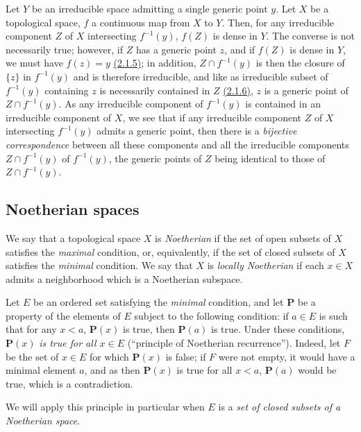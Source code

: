 \begin{env}[2.1.8]
\label{env-0.2.1.8}
Let $Y$ be an irreducible space admitting a single generic point $y$. Let $X$ be
a topological space, $f$ a continuous map from $X$ to $Y$. Then, for any
irreducible component $Z$ of $X$ intersecting $f^{-1}(y)$, $f(Z)$ is dense in
$Y$. The converse is not necessarily true; however, if $Z$ has a generic point
$z$, and if $f(Z)$ is dense in $Y$, we must have $f(z)=y$ \hyperref[env-0.2.1.5]{(2.1.5)}; in
addition, $Z\cap f^{-1}(y)$ is then the closure of $\{z\}$ in $f^{-1}(y)$ and is
therefore irreducible, and like as irreducible subset of $f^{-1}(y)$ containing
$z$ is necessarily contained in $Z$ \hyperref[env-0.2.1.6]{(2.1.6)}, $z$ is a generic point of
$Z\cap f^{-1}(y)$. As any irreducible component of $f^{-1}(y)$ is contained in
an irreducible component of $X$, we see that if any irreducible component $Z$ of
$X$ intersecting $f^{-1}(y)$ admits a generic point, then there is a
{\em bijective correspondence} between all these components and all the
irreducible components $Z\cap f^{-1}(y)$ of $f^{-1}(y)$, the generic points of
$Z$ being identical to those of $Z\cap f^{-1}(y)$.
\end{env}

\subsection{Noetherian spaces}
\label{subsection-noetherian-spaces}

\begin{env}[2.2.1]
\label{env-0.2.2.1}
We say that a topological space $X$ is {\em Noetherian} if the set of open
subsets of $X$ satisfies the {\em maximal} condition, or, equivalently, if the
set of closed subsets of $X$ satisfies the {\em minimal} condition. We say that
$X$ is {\em locally Noetherian} if each $x\in X$ admits a neighborhood which is
a Noetherian subspace.
\end{env}

\begin{env}[2.2.2]
\label{env-0.2.2.2}
Let $E$ be an ordered set satisfying the {\em minimal} condition, and let
$\mathbf{P}$ be a property of the elements of $E$ subject to the following
condition: if $a\in E$ is such that for any $x<a$, $\mathbf{P}(x)$ is true, then
$\mathbf{P}(a)$ is true. Under these conditions, $\mathbf{P}(x)$ {\em is true
for all $x\in E$} (``principle of Noetherian recurrence''). Indeed, let $F$ be
the set of $x\in E$ for which $\mathbf{P}(x)$ is false; if $F$ were not empty,
it would have a minimal element $a$, and as then $\mathbf{P}(x)$ is true for all
$x<a$, $\mathbf{P}(a)$ would be true, which is a contradiction.

We will apply this principle in particular when $E$ is a {\em set of closed
subsets of a Noetherian space}.
\end{env}

